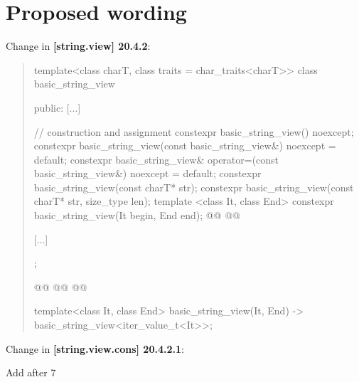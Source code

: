 \documentclass{wg21}
\begin{document}
\section{Proposed wording}

Change in \textbf{[string.view] 20.4.2}:
\begin{quote}
\begin{codeblock}

template<class charT, class traits = char_traits<charT>>
class basic_string_view {
public:
    [...]

    // construction and assignment
    constexpr basic_string_view() noexcept;
    constexpr basic_string_view(const basic_string_view&) noexcept = default;
    constexpr basic_string_view& operator=(const basic_string_view&) noexcept = default;
    constexpr basic_string_view(const charT* str);
    constexpr basic_string_view(const charT* str, size_type len);
    template <class It, class End>
    constexpr basic_string_view(It begin, End end);
    @@
    @@
    

    [...]
};

@@
@@
@@

template<class It, class End>
basic_string_view(It, End) -> basic_string_view<iter_value_t<It>>;




\end{codeblock}
\end{quote}

Change in \textbf{[string.view.cons] 20.4.2.1}:

Add after 7
\end{document}
